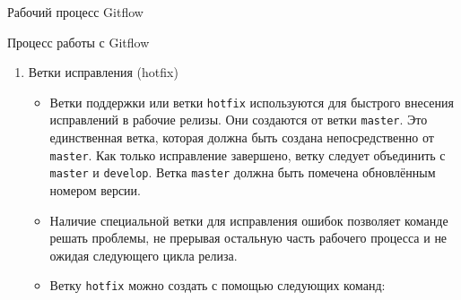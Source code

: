 \documentclass[
  ignorenonframetext,
  aspectratio=169,
  russian,
]{beamer}
\providecommand{\tightlist}{%
  \setlength{\itemsep}{0pt}\setlength{\parskip}{0pt}}
\begin{document}
\begin{frame}[fragile]{Рабочий процесс Gitflow}
\begin{block}{Процесс работы с Gitflow}
\begin{enumerate}[<+->]
\begin{itemize}[<+->]
\begin{enumerate}[<+->]
      \begin{itemize}[<+->]
      \tightlist
      \item
        Когда в ветке \texttt{develop} оказывается достаточно функций
        для выпуска, из ветки \texttt{develop} создаётся ветка
        \texttt{release}. Создание этой ветки запускает следующий цикл
        выпуска, и с этого момента новые функции добавить больше нельзя
        --- допускается лишь отладка, создание документации и решение
        других задач. Когда подготовка релиза завершается, ветка
        \texttt{release} сливается с \texttt{master} и ей присваивается
        номер версии. После нужно выполнить слияние с веткой
        \texttt{develop}, в которой с момента создания ветки релиза
        могли возникнуть изменения.
      \item
        Благодаря тому, что для подготовки выпусков используется
        специальная ветка, одна команда может дорабатывать текущий
        выпуск, в то время как другая команда продолжает работу над
        функциями для следующего.
      \item
        Создать новую ветку release можно с помощью следующей команды:
      \end{itemize}

\begin{verbatim}
git flow release start 1.0.0
\end{verbatim}

      \begin{itemize}[<+->]
      \tightlist
      \item
        Для завершения работы на ветке release используются следующие
        команды:
      \end{itemize}

\begin{verbatim}
git flow release finish 1.0.0
\end{verbatim}
    \item
      Ветки исправления (hotfix)

      \begin{itemize}[<+->]
      \tightlist
      \item
        Ветки поддержки или ветки \texttt{hotfix} используются для
        быстрого внесения исправлений в рабочие релизы. Они создаются от
        ветки \texttt{master}. Это единственная ветка, которая должна
        быть создана непосредственно от \texttt{master}. Как только
        исправление завершено, ветку следует объединить с
        \texttt{master} и \texttt{develop}. Ветка \texttt{master} должна
        быть помечена обновлённым номером версии.
      \item
        Наличие специальной ветки для исправления ошибок позволяет
        команде решать проблемы, не прерывая остальную часть рабочего
        процесса и не ожидая следующего цикла релиза.
      \item
        Ветку \texttt{hotfix} можно создать с помощью следующих команд:
      \end{itemize}


\end{enumerate}
\end{itemize}
\end{enumerate}
\end{block}
\end{frame}
\end{document}
